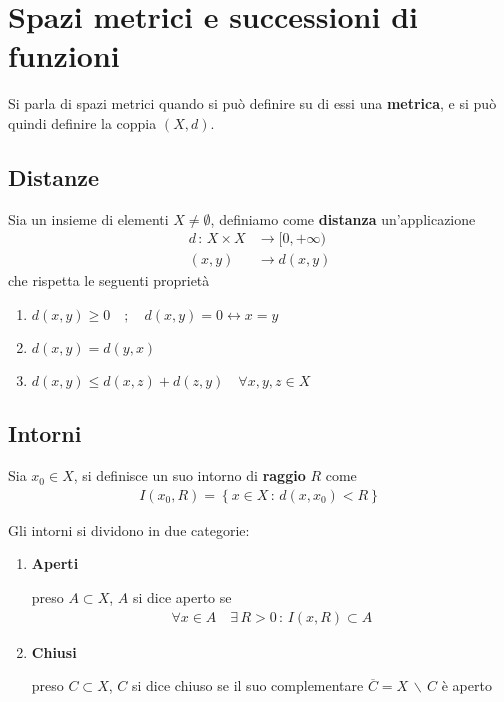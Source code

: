\chapter{Spazi metrici e successioni di funzioni}

Si parla di spazi metrici quando si può definire su di essi una \textbf{metrica}, e si può quindi definire la coppia $(X,d)$.

\section{Distanze}

Sia un insieme di elementi $X \neq \emptyset$, definiamo come  \textbf{distanza} un'applicazione 
\begin{align}
d \, : \, X \times X {}&\rightarrow [0, + \infty) \\
(x,y) &\rightarrow d(x,y)
\end{align}
che rispetta le seguenti proprietà
\begin{enumerate}
	\item $d(x,y) \geq 0 \quad ; \quad d(x,y) = 0 \leftrightarrow x=y$
	\item $d(x,y)=d(y,x)$
	\item $d(x,y) \leq d(x,z) + d(z,y) \quad \forall x,y,z \in X$ \quad {}
\end{enumerate}

\section{Intorni}

Sia $x_0 \in X$, si definisce un suo intorno di \textbf{raggio} $R$ come
\begin{align}
I(x_0,R) = \left\{x\in X \, : \, d(x,x_0)<R
\right\}
\end{align}

Gli intorni si dividono in due categorie:
\begin{enumerate}
	\item \textbf{Aperti}
	
	preso $A \subset X$, $A$ si dice aperto se 
	\begin{align}
	\forall x \in A \quad \exists \, R>0 \, : \, I(x,R)\subset A
	\end{align}
	
	\item \textbf{Chiusi}
	
	preso $C \subset X$, $C$ si dice chiuso se il suo complementare $\overline{C}= X \, \backslash \, C$ è aperto
\end{enumerate}

